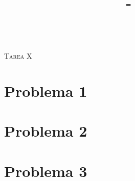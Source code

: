 \documentclass[letterpaper,12pt]{article}
\title{\Titulo\ -\ \Sigla\ \Ramo}
\author{\Nombre}
\newcommand{\Titulo}{Tarea X}
\numberwithin{equation}{section}
\begin{document}
\thispagestyle{empty}


\begin{center}
    \huge{\textsc{\Ramo\\ \Titulo}}
\end{center}

\vspace{1em}



\section{Problema 1}
\vspace{0.8em}
    
\clearpage

\section{Problema 2}
\vspace{0.8em}
    
\clearpage

\section{Problema 3}
\vspace{0.8em}
    
\clearpage
\end{document}
